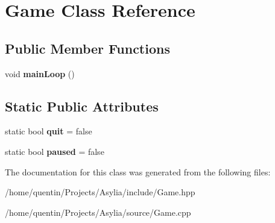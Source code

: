 \hypertarget{classGame}{\section{Game Class Reference}
\label{classGame}
}
\subsection*{Public Member Functions}
\begin{DoxyCompactItemize}
\item 
\hypertarget{classGame_ae89e277761b7dc5bc7a23fd1b4c6f17d}{void {\bfseries main\-Loop} ()}\label{classGame_ae89e277761b7dc5bc7a23fd1b4c6f17d}

\end{DoxyCompactItemize}
\subsection*{Static Public Attributes}
\begin{DoxyCompactItemize}
\item 
\hypertarget{classGame_ab707809025007494f4cdb1392b56cab9}{static bool {\bfseries quit} = false}\label{classGame_ab707809025007494f4cdb1392b56cab9}

\item 
\hypertarget{classGame_a255049de8fb46a9f00946631e3121c03}{static bool {\bfseries paused} = false}\label{classGame_a255049de8fb46a9f00946631e3121c03}

\end{DoxyCompactItemize}


The documentation for this class was generated from the following files\-:\begin{DoxyCompactItemize}
\item 
/home/quentin/\-Projects/\-Asylia/include/Game.\-hpp\item 
/home/quentin/\-Projects/\-Asylia/source/Game.\-cpp\end{DoxyCompactItemize}
